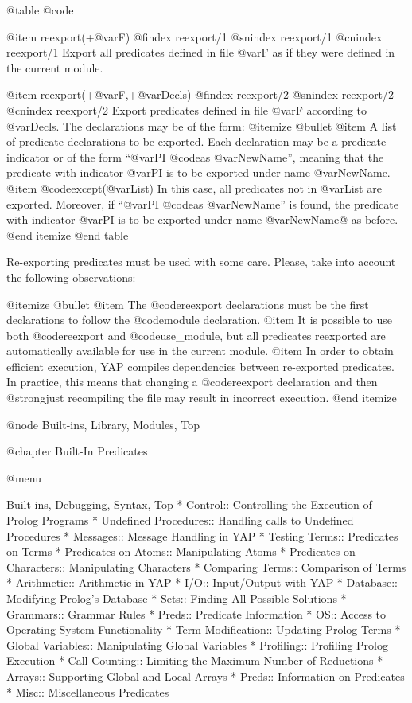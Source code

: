 {{{{@table @code

@item reexport(+@var{F})
@findex reexport/1
@snindex reexport/1
@cnindex reexport/1
Export all predicates defined in file @var{F} as if they were defined in
the current module.

@item reexport(+@var{F},+@var{Decls})
@findex reexport/2
@snindex reexport/2
@cnindex reexport/2
Export predicates defined in file @var{F} according to @var{Decls}. The
declarations may be of the form:
@itemize @bullet
@item A list of predicate declarations to be exported. Each declaration
may be a predicate indicator or of the form ``@var{PI} @code{as}
@var{NewName}'', meaning that the predicate with indicator @var{PI} is
to be exported under name @var{NewName}.
@item @code{except}(@var{List}) 
In this case, all predicates not in @var{List} are exported. Moreover,
if ``@var{PI} @code{as} @var{NewName}'' is found, the predicate with
indicator @var{PI} is to be exported under name @var{NewName}@ as
before.
@end itemize
@end table

Re-exporting predicates must be used with some care. Please, take into
account the following observations:

@itemize @bullet
@item
The @code{reexport} declarations must be the first declarations to
follow the  @code{module} declaration.
@item
It is possible to use both @code{reexport} and @code{use_module}, but
all predicates reexported are automatically available for use in the
current module.
@item
In order to obtain efficient execution, YAP compiles dependencies
between re-exported predicates. In practice, this means that changing a
@code{reexport} declaration and then @strong{just} recompiling the file
may result in incorrect execution.
@end itemize


@node Built-ins, Library, Modules, Top

@chapter Built-In Predicates

@menu

Built-ins, Debugging, Syntax, Top
* Control:: Controlling the Execution of Prolog Programs
* Undefined Procedures:: Handling calls to Undefined Procedures
* Messages:: Message Handling in YAP
* Testing Terms:: Predicates on Terms
* Predicates on Atoms:: Manipulating Atoms
* Predicates on Characters:: Manipulating Characters
* Comparing Terms:: Comparison of Terms
* Arithmetic:: Arithmetic in YAP
* I/O:: Input/Output with YAP
* Database:: Modifying Prolog's Database
* Sets:: Finding All Possible Solutions
* Grammars:: Grammar Rules
* Preds:: Predicate Information
* OS:: Access to Operating System Functionality
* Term Modification:: Updating Prolog Terms
* Global Variables:: Manipulating Global Variables
* Profiling:: Profiling Prolog Execution
* Call Counting:: Limiting the Maximum Number of Reductions
* Arrays:: Supporting Global and Local Arrays
* Preds:: Information on Predicates
* Misc:: Miscellaneous Predicates

}}}}

